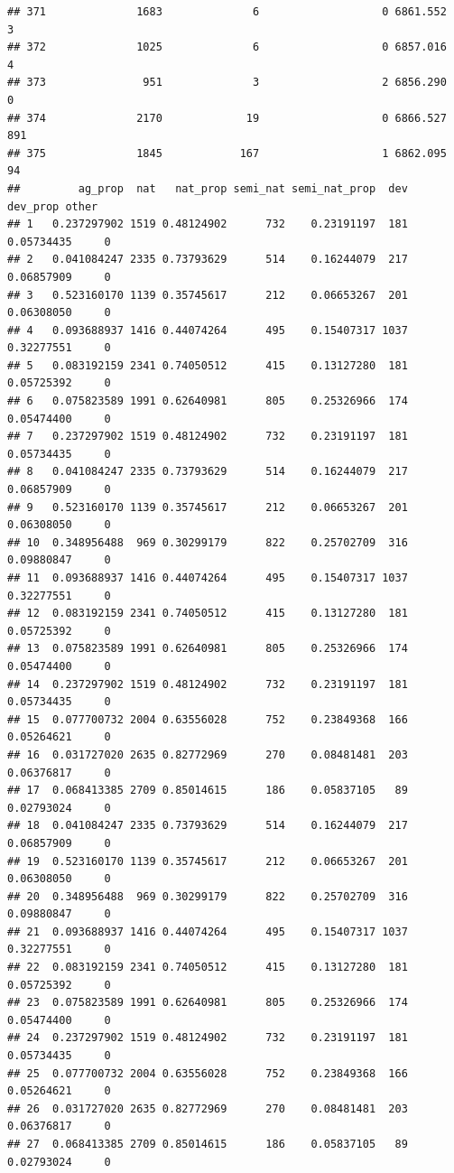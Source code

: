\documentclass[
]{article}
\begin{document}
\begin{verbatim}
## 371              1683              6                   0 6861.552    3
## 372              1025              6                   0 6857.016    4
## 373               951              3                   2 6856.290    0
## 374              2170             19                   0 6866.527  891
## 375              1845            167                   1 6862.095   94
##         ag_prop  nat   nat_prop semi_nat semi_nat_prop  dev   dev_prop other
## 1   0.237297902 1519 0.48124902      732    0.23191197  181 0.05734435     0
## 2   0.041084247 2335 0.73793629      514    0.16244079  217 0.06857909     0
## 3   0.523160170 1139 0.35745617      212    0.06653267  201 0.06308050     0
## 4   0.093688937 1416 0.44074264      495    0.15407317 1037 0.32277551     0
## 5   0.083192159 2341 0.74050512      415    0.13127280  181 0.05725392     0
## 6   0.075823589 1991 0.62640981      805    0.25326966  174 0.05474400     0
## 7   0.237297902 1519 0.48124902      732    0.23191197  181 0.05734435     0
## 8   0.041084247 2335 0.73793629      514    0.16244079  217 0.06857909     0
## 9   0.523160170 1139 0.35745617      212    0.06653267  201 0.06308050     0
## 10  0.348956488  969 0.30299179      822    0.25702709  316 0.09880847     0
## 11  0.093688937 1416 0.44074264      495    0.15407317 1037 0.32277551     0
## 12  0.083192159 2341 0.74050512      415    0.13127280  181 0.05725392     0
## 13  0.075823589 1991 0.62640981      805    0.25326966  174 0.05474400     0
## 14  0.237297902 1519 0.48124902      732    0.23191197  181 0.05734435     0
## 15  0.077700732 2004 0.63556028      752    0.23849368  166 0.05264621     0
## 16  0.031727020 2635 0.82772969      270    0.08481481  203 0.06376817     0
## 17  0.068413385 2709 0.85014615      186    0.05837105   89 0.02793024     0
## 18  0.041084247 2335 0.73793629      514    0.16244079  217 0.06857909     0
## 19  0.523160170 1139 0.35745617      212    0.06653267  201 0.06308050     0
## 20  0.348956488  969 0.30299179      822    0.25702709  316 0.09880847     0
## 21  0.093688937 1416 0.44074264      495    0.15407317 1037 0.32277551     0
## 22  0.083192159 2341 0.74050512      415    0.13127280  181 0.05725392     0
## 23  0.075823589 1991 0.62640981      805    0.25326966  174 0.05474400     0
## 24  0.237297902 1519 0.48124902      732    0.23191197  181 0.05734435     0
## 25  0.077700732 2004 0.63556028      752    0.23849368  166 0.05264621     0
## 26  0.031727020 2635 0.82772969      270    0.08481481  203 0.06376817     0
## 27  0.068413385 2709 0.85014615      186    0.05837105   89 0.02793024     0

\end{verbatim}
\end{document}
